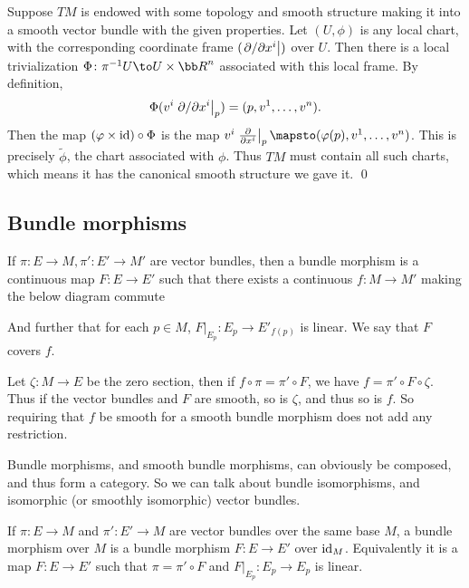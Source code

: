 \eprop

\bproof

    Suppose $TM$ is endowed with some topology and smooth structure making it into a smooth vector bundle with the given properties.
    Let $(U,\phi)$ is any local chart, with the corresponding coordinate frame $(\left.\partial /\partial x^i\right|)$ over $U$.
    Then there is a local trivialization $\Phi\colon\pi^{-1}U\to U\times\bR^n$ associated with this local frame.
    By definition,
    $$ \Phi(v^i\left.\partial /\partial x^i\right|_p) = (p,v^1,\dots,v^n) . $$
    Then the map $(\varphi\times{\rm id})\circ\Phi$ is the map $v^i\evpdv{x^i}_p\mapsto(\phi(p),v^1,\dots,v^n)$.
    This is precisely $\tilde\phi$, the chart associated with $\phi$.
    Thus $TM$ must contain all such charts, which means it has the canonical smooth structure we gave it.
    \qed

\eproof

\subsection{Bundle morphisms}

\bdefn

    If $\pi\colon E\to M,\pi'\colon E'\to M'$ are vector bundles, then a {\emphcolor bundle morphism} is a continuous map $F\colon E\to E'$
    such that there exists a continuous $f\colon M\to M'$ making the below diagram commute


    And further that for each $p\in M$, $F|_{E_p}\colon E_p\to E'_{f(p)}$ is linear.
    We say that $F$ {\emphcolor covers} $f$.

\edefn

Let $\zeta\colon M\to E$ be the zero section, then if $f\circ\pi=\pi'\circ F$, we have $f=\pi'\circ F\circ\zeta$.
Thus if the vector bundles and $F$ are smooth, so is $\zeta$, and thus so is $f$.
So requiring that $f$ be smooth for a smooth bundle morphism does not add any restriction.

Bundle morphisms, and smooth bundle morphisms, can obviously be composed, and thus form a category.
So we can talk about bundle isomorphisms, and isomorphic (or smoothly isomorphic) vector bundles.

\bdefn

    If $\pi\colon E\to M$ and $\pi'\colon E'\to M$ are vector bundles over the same base $M$, a {\emphcolor bundle morphism over $M$}
    is a bundle morphism $F\colon E\to E'$ over ${\rm id}_M$.
    Equivalently it is a map $F\colon E\to E'$ such that $\pi=\pi'\circ F$ and $F|_{E_p}\colon E_p\to E_p$ is linear.

